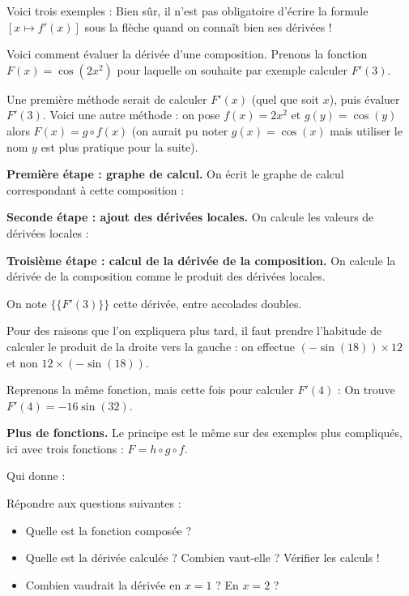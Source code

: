 \documentclass[11pt,class=report,crop=false]{standalone}
\begin{document}
Voici trois exemples :
Bien sûr, il n'est pas obligatoire d'écrire la formule $[x \mapsto f'(x)]$ sous la flèche quand on connaît bien ses dérivées !


Voici comment évaluer la dérivée d'une composition. Prenons la fonction $F(x) = \cos(2x^2)$ pour laquelle on souhaite par exemple calculer $F'(3)$. 



Une première méthode serait de calculer $F'(x)$ (quel que soit $x$), puis évaluer $F'(3)$. Voici une autre méthode : on pose $f(x)=2x^2$ et $g(y)=\cos(y)$ alors $F(x) = g \circ f(x)$ (on aurait pu noter $g(x) = \cos(x)$ mais utiliser le nom $y$ est plus pratique pour la suite).



\textbf{Première étape : graphe de calcul.}
On écrit le graphe de calcul correspondant à cette composition :

\textbf{Seconde étape : ajout des dérivées locales.}
On calcule les valeurs de dérivées locales :

\textbf{Troisième étape : calcul de la dérivée de la composition.}
On calcule la dérivée de la composition comme le produit des dérivées locales.

On note $\{\{F'(3)\}\}$ cette dérivée, entre accolades doubles.




Pour des raisons que l'on expliquera plus tard, il faut prendre l'habitude de calculer le produit de la droite vers la gauche : on effectue $(-\sin(18)) \times 12$ et non $12 \times (-\sin(18))$.


Reprenons la même fonction, mais cette fois pour calculer $F'(4)$ :
On trouve $F'(4) = -16\sin(32)$.


\bigskip
\textbf{Plus de fonctions.}
Le principe est le même sur des exemples plus compliqués, ici avec trois fonctions : $F = h\circ g \circ f$.


Qui donne :


Répondre aux questions suivantes :
\begin{itemize}
  \item Quelle est la fonction composée ?
  \item Quelle est la dérivée calculée ? Combien vaut-elle ? Vérifier les calculs !
  \item Combien vaudrait la dérivée en $x=1$ ? En $x=2$ ?
 
\end{itemize}
\end{document}
